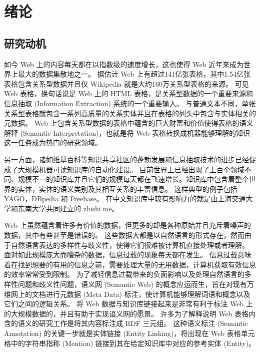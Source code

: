 \chapter{绪论}

\section{研究动机}
如今 Web 上的内容每天都在以指数级的速度增长\cite{limaye2010annotating}，这也使得 Web 近年来成为世界上最大的数据集散地之一。
据估计 Web 上有超过141亿张表格，其中1.54亿张表格包含关系型数据并且仅 Wikipedia 就是大约160万关系型表格的来源。
可见Web 表格，换句话说是 Web 上的 HTML 表格，是关系型数据的一个重要来源和信息抽取 (Information Extraction) 系统的一个重要输入。
与普通文本不同，单张关系型表格就包含一系列高质量的关系实体并且在表格的列头中包含与实体相关的元数据。
Web 上包含关系型数据的表格中蕴含的巨大财富和价值使得表格的语义解释 (Semantic Interpretation)，也就是将 Web 表格转换成机器能够理解的知识这一任务成为热门的研究领域。\par

另一方面，诸如维基百科等知识共享社区的蓬勃发展和信息抽取技术的进步已经促成了大规模机器可读知识库的自动化建设。
目前世界上已经出现了上百个领域不同、规模不一的知识库并且它们的规模每天都在飞速增长。知识库中包含着整个世界的实体，实体的语义类别及其相互关系的丰富信息。
这样典型的例子包括 YAGO\cite{suchanek2007yago}，DBpedia\cite{auer2007dbpedia} 和 Freebase\cite{bollacker2008freebase}。
在中文知识库中较有影响力的就是由上海交通大学和东南大学共同建立的 zhishi.me\cite{niu2011zhishi}。\par

Web 上虽然蕴含着许多有价值的数据，但更多的却是各种原始并且充斥着噪声的数据，其中有些甚至是错误的。
这些数据大都是以自然语言的形式存在，然而由于自然语言表达的多样性与歧义性，使得它们很难被计算机直接处理或者理解。
面对如此规模庞大而嘈杂的数据，信息过载的现象每天都在发生。
信息过载意味着在找到想要的有用的信息之前，需要处理大量的无用数据，计算机获取有效信息的效率常常受到限制。
为了减轻信息过载带来的负面影响以及处理自然语言的多样性问题和歧义性问题，语义网 (Semantic Web) 的概念应运而生，旨在对现有万维网上的文档进行元数据 (Meta Data) 标注，使计算机能够理解词语和概念以及它们之间的逻辑关系。
将 Web 数据与知识库链接起来是非常有利于标注 Web 上的大规模数据的，并且有助于实现语义网的愿景\cite{berners2001}。
许多为了解释说明 Web 表格内含的语义的研究工作\cite{limaye2010annotating}\cite{hignette2009fuzzy}\cite{mulwad2013semantic}\cite{munoz2014using}\cite{syed2010exploiting}\cite{venetis2011recovering}是将其内容标注成 RDF 三元组。
这种语义标注 (Semantic Annotation) 的关键一步就是实体链接 (Entity Linking)，将出现在 Web 表格单元格中的字符串指称 (Mention) 链接到其在给定知识库中对应的参考实体 (Entity)。\par

